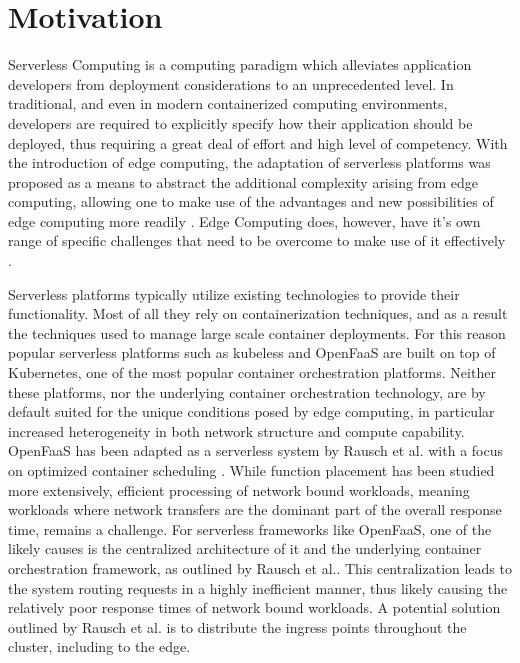 \section{Motivation}
Serverless Computing is a computing paradigm which alleviates application developers from deployment considerations to an unprecedented level. %
In traditional, and even in modern containerized computing environments, developers are required to explicitly specify how their application should be deployed, thus requiring a great deal of effort and high level of competency. %
With the introduction of edge computing, the adaptation of serverless platforms was proposed as a means to abstract the additional complexity arising from edge computing, allowing one to make use of the advantages and new possibilities of edge computing more readily \cite{nasticServerlessRealTimeData2017}\cite{gliksonDevicelessEdgeComputing2017}.
Edge Computing does, however, have it's own range of specific challenges that need to be overcome to make use of it effectively \cite{shiEdgeComputingVisionChallenges2016}.

Serverless platforms typically utilize existing technologies to provide their functionality. Most of all they rely on containerization techniques, and as a result the techniques used to manage large scale container deployments.
For this reason popular serverless platforms such as kubeless and OpenFaaS are built on top of Kubernetes, one of the most popular container orchestration platforms.
Neither these platforms, nor the underlying container orchestration technology, are by default suited for the unique conditions posed by edge computing, in particular increased heterogeneity in both network structure and compute capability.
OpenFaaS has been adapted as a serverless system by Rausch et al. with a focus on optimized container scheduling \cite{skippy}.
While function placement has been studied more extensively, efficient processing of network bound workloads, meaning workloads where network transfers are the dominant part of the overall response time, remains a challenge. For serverless frameworks like OpenFaaS, one of the likely causes is the centralized architecture of it and the underlying container orchestration framework, as outlined by Rausch et al.\cite{skippy}.
This centralization leads to the system routing requests in a highly inefficient manner, thus likely causing the relatively poor response times of network bound workloads. A potential solution outlined by Rausch et al. is to distribute the ingress points throughout the cluster, including to the edge\cite{skippy}.


